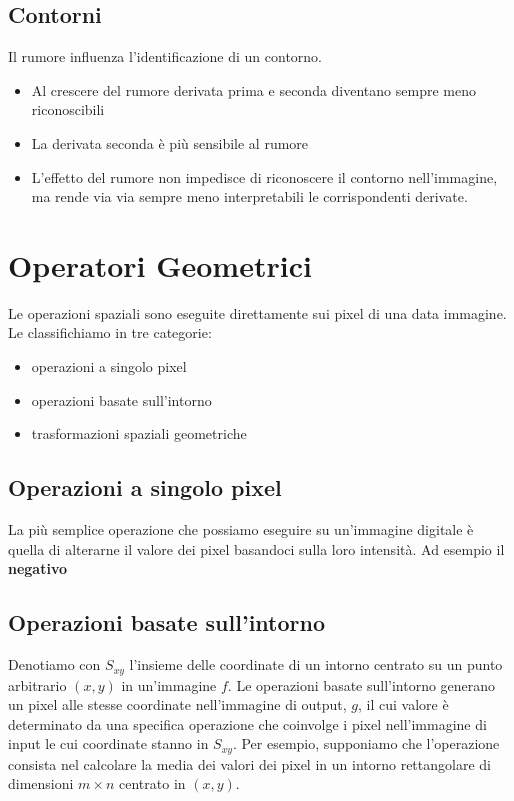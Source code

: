 \documentclass[12pt]{article}
\begin{document}
\subsection{Contorni}
Il rumore influenza l’identificazione di un contorno.
\begin{itemize}
    \item Al crescere del rumore derivata prima e seconda diventano sempre meno riconoscibili
    \item La derivata seconda è più sensibile al rumore
    \item L’effetto del rumore non impedisce di riconoscere il contorno nell’immagine, ma rende via via sempre meno interpretabili le corrispondenti derivate.
\end{itemize}
\newpage
\section{Operatori Geometrici}
Le operazioni spaziali sono eseguite direttamente sui pixel di una data immagine. Le classifichiamo in tre categorie:
\begin{itemize}
    \item operazioni a singolo pixel
    \item operazioni basate sull'intorno
    \item trasformazioni spaziali geometriche
\end{itemize}

\subsection{Operazioni a singolo pixel}
La più semplice operazione che possiamo eseguire su un'immagine digitale è quella di alterarne il valore dei pixel basandoci sulla loro intensità. Ad esempio il \textbf{negativo}
\subsection{Operazioni basate sull'intorno}
Denotiamo con $S_{xy}$ l'insieme delle coordinate di un intorno centrato su un punto arbitrario $(x, y)$ in un'immagine $f$. Le operazioni basate sull'intorno generano un pixel alle stesse coordinate nell'immagine di output, $g$, il cui valore è determinato da una specifica operazione che coinvolge i pixel nell'immagine di input le cui coordinate stanno in $S_{xy}$. Per esempio, supponiamo che l'operazione consista nel calcolare la media dei valori dei pixel in un intorno rettangolare di dimensioni $m \times n$ centrato in $(x, y)$.
\end{document}
